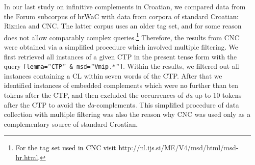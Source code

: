 
\noindent In our last study on infinitive complements in Croatian, we compared data from the Forum subcorpus of hrWaC with data from corpora of standard Croatian: Riznica and CNC. The latter corpus uses an older tag set, and for some reason does not allow comparably complex queries.\footnote{\textcolor{black}{For the tag set used in CNC visit} \url{http://nl.ijs.si/ME/V4/msd/html/msd-hr.html}.} Therefore, the results from CNC were obtained via a simplified procedure which involved multiple filtering. We first retrieved all instances of a given CTP in the present tense form with the query \texttt{[lemma=$"$CTP$"$ \& msd=$"$Vmip.*$"$]}. Within the results, we filtered out all instances containing a CL within seven words of the CTP. After that we identified instances of embedded complements which were no further than ten tokens after the CTP, and then excluded the occurrences of \textit{da} up to 10 tokens after the CTP to avoid the \textit{da}-complements. This simplified procedure of data collection with multiple filtering was also the reason why CNC was used only as a complementary source of standard Croatian.

